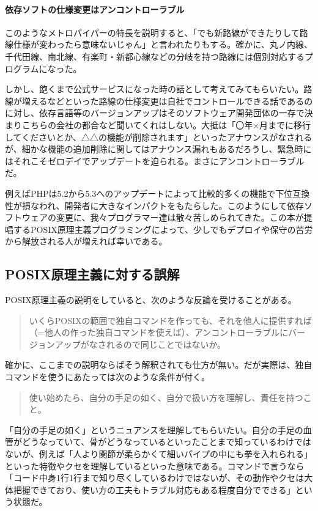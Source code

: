 \paragraph{依存ソフトの仕様変更はアンコントローラブル}

このようなメトロパイパーの特長を説明すると、「でも新路線ができたりして路線仕様が変わったら意味ないじゃん」と言われたりもする。確かに、丸ノ内線、千代田線、南北線、有楽町・新都心線などの分岐を持つ路線には個別対応するプログラムになった。

しかし、飽くまで公式サービスになった時の話として考えてみてもらいたい。路線が増えるなどといった路線の仕様変更は自社でコントロールできる話であるのに対し、依存言語等のバージョンアップはそのソフトウェア開発団体の一存で決まりこちらの会社の都合など聞いてくれはしない。大抵は「〇年×月までに移行してくださいとか、△△の機能が削除されます」といったアナウンスがなされるが、細かな機能の追加削除に関してはアナウンス漏れもあるだろうし、緊急時にはそれこそゼロデイでアップデートを迫られる。まさにアンコントローラブルだ。

例えばPHPは5.2から5.3へのアップデートによって比較的多くの機能で下位互換性が損なわれ、開発者に大きなインパクトをもたらした。このようにして依存ソフトウェアの変更に、我々プログラマー達は散々苦しめられてきた。この本が提唱するPOSIX原理主義プログラミングによって、少しでもデプロイや保守の苦労から解放される人が増えれば幸いである。

\subsection*{POSIX原理主義に対する誤解}

POSIX原理主義の説明をしていると、次のような反論を受けることがある。
\begin{quotation}
	\noindent
	いくらPOSIXの範囲で独自コマンドを作っても、それを他人に提供すれば（=他人の作った独自コマンドを使えば）、アンコントローラブルにバージョンアップがなされるので同じことではないか。
\end{quotation}

確かに、ここまでの説明ならばそう解釈されても仕方が無い。だが実際は、独自コマンドを使うにあたっては次のような条件が付く。\begin{quotation}
	\noindent
	使い始めたら、自分の手足の如く、自分で扱い方を理解し、責任を持つこと。
\end{quotation}

「自分の手足の如く」というニュアンスを理解してもらいたい。自分の手足の血管がどうなっていて、骨がどうなっているといったことまで知っているわけではないが、例えば「人より関節が柔らかくて細いパイプの中にも拳を入れられる」といった特徴やクセを理解しているといった意味である。コマンドで言うなら「コード中身1行1行まで知り尽くしているわけではないが、その動作やクセは大体把握できており、使い方の工夫もトラブル対応もある程度自分でできる」という状態だ。

